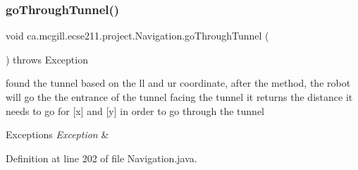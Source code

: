 \subsubsection{\texorpdfstring{go\+Through\+Tunnel()}{goThroughTunnel()}}
{\footnotesize\ttfamily void ca.\+mcgill.\+ecse211.\+project.\+Navigation.\+go\+Through\+Tunnel (\begin{DoxyParamCaption}{ }\end{DoxyParamCaption}) throws Exception}

found the tunnel based on the ll and ur coordinate, after the method, the robot will go the the entrance of the tunnel facing the tunnel it returns the distance it needs to go for \mbox{[}x\mbox{]} and \mbox{[}y\mbox{]} in order to go through the tunnel 
\begin{DoxyExceptions}{Exceptions}
{\em Exception} & \\
\hline
\end{DoxyExceptions}


Definition at line 202 of file Navigation.\+java.



